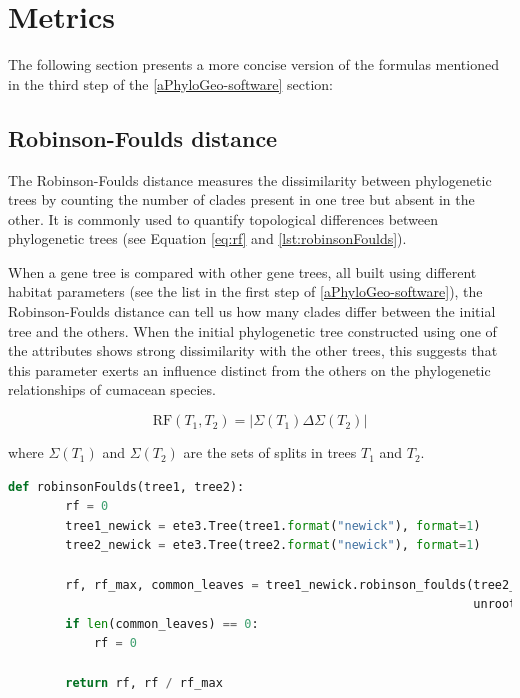 \section{Metrics}\label{metrics}
The following section presents a more concise version of the formulas mentioned in the third step of the \autoref{aPhyloGeo-software} section:

\subsection{Robinson-Foulds distance}\label{RF}

The Robinson-Foulds distance measures the dissimilarity between phylogenetic trees by counting the number of clades present in one tree but absent in the other. It is commonly used to quantify topological differences between phylogenetic trees (see Equation \eqref{eq:rf} and \autoref{lst:robinsonFoulds}).

When a gene tree is compared with other gene trees, all built using different habitat parameters (see the list in the first step of \autoref{aPhyloGeo-software}), the Robinson-Foulds distance can tell us how many clades differ between the initial tree and the others. When the initial phylogenetic tree constructed using one of the attributes shows strong dissimilarity with the other trees, this suggests that this parameter exerts an influence distinct from the others on the phylogenetic relationships of cumacean species.

\begin{equation}\label{eq:rf}
    \text{RF}(T_1, T_2) = | \Sigma(T_1) \Delta \Sigma(T_2) |
\end{equation}

where $\Sigma(T_1)$ and $\Sigma(T_2)$ are the sets of splits in trees $T_1$ and $T_2$.

\begin{lstlisting}[label=lst:robinsonFoulds,language=Python,caption=Python script for calculating the Robinson-Foulds distance using the ete3 package in the aPhyloGeo package.]
    def robinsonFoulds(tree1, tree2):
        rf = 0
        tree1_newick = ete3.Tree(tree1.format("newick"), format=1)
        tree2_newick = ete3.Tree(tree2.format("newick"), format=1)

        rf, rf_max, common_leaves = tree1_newick.robinson_foulds(tree2_newick, 
                                                                 unrooted_trees=True)
        if len(common_leaves) == 0:
            rf = 0

        return rf, rf / rf_max
\end{lstlisting}


